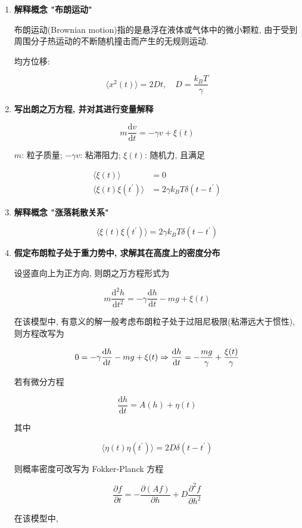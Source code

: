 \documentclass[../../main.tex]{subfiles}
\begin{document}
\begin{enumerate}
    \item \textbf{解释概念 "布朗运动"}

布朗运动(Brownian motion)指的是悬浮在液体或气体中的微小颗粒, 由于受到周围分子热运动的不断随机撞击而产生的无规则运动. 

均方位移:

$$
\langle x^{2}(t)\rangle = 2Dt, \quad D = \frac{k_{B}T}{\gamma}
$$
    \item \textbf{写出朗之万方程, 并对其进行变量解释}
    
$$
m\frac{\mathrm{d}v}{\mathrm{d}t} = -\gamma v + \xi(t)
$$

$m$: 粒子质量; $-\gamma v$: 粘滞阻力; $\xi(t)$: 随机力, 且满足

$$
\begin{aligned}
\langle \xi(t)\rangle &= 0\\ \langle \xi(t)\xi(t^{\prime})\rangle &= 2\gamma k_{B}T \delta(t-t^{\prime})
\end{aligned}
$$
    \item \textbf{解释概念 "涨落耗散关系"}

$$
\boxed{\langle \xi(t)\xi(t^{\prime})\rangle = 2\gamma k_{B}T \delta(t-t^{\prime})}
$$

    \item \textbf{假定布朗粒子处于重力势中, 求解其在高度上的密度分布}

设竖直向上为正方向, 则朗之万方程形式为

$$
m\frac{\mathrm{d}^{2}h}{\mathrm{d}t^{2}} = -\gamma \frac{\mathrm{d}h}{\mathrm{d}t} - mg + \xi(t)
$$

在该模型中, 有意义的解一般考虑布朗粒子处于过阻尼极限(粘滞远大于惯性), 则方程改写为

$$
0 = -\gamma\frac{\mathrm{d}h}{\mathrm{d}t} - mg + \xi(t)\\
\Rightarrow \frac{\mathrm{d}h}{\mathrm{d}t} = -\frac{mg}{\gamma} + \frac{\xi(t)}{\gamma}
$$

若有微分方程

$$
\frac{\mathrm{d}h}{\mathrm{d}t} = A(h) + \eta(t)
$$

其中

$$
\langle \eta(t)\eta(t^{\prime})\rangle = 2D\delta(t-t^{\prime})
$$

则概率密度可改写为 Fokker-Planck 方程

$$
\frac{\partial f}{\partial t} = - \frac{\partial (Af)}{\partial h} + D\frac{\partial^{2}f}{\partial h^{2}}
$$

在该模型中, 


\end{enumerate}
\end{document}
